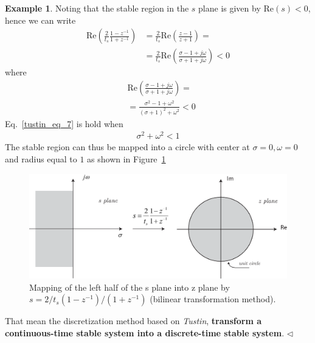\documentclass[11pt,a4paper,oneside]{book}
\numberwithin{equation}{section}
\theoremstyle{it}
\theoremstyle{definition}
\newtheorem{example}{Example}[chapter]
\begin{document}
\begin{example}
Noting that the stable region in the $s$ plane is given by $\text{Re}(s)<0$, hence we can write
\begin{equation}\label{tustin_eq_6}
	\begin{split}
		\text{Re}\left(\frac{2}{t_s}\frac{1-z^{-1}}{1+z^{-1}} \right) &= \frac{2}{t_s}\text{Re}\left(\frac{z-1}{z+1} \right) = \\[6pt]
		&= \frac{2}{t_s}\text{Re}\left(\frac{\sigma -1 +j\omega}{\sigma+1+j\omega} \right)<0
	\end{split}
\end{equation}
where
\begin{equation}\label{tustin_eq_7}
	\begin{split}
		& \text{Re}\left(\frac{\sigma -1 +j\omega}{\sigma+1+j\omega} \right) = \\[6pt]
		& = \frac{\sigma^2-1+\omega^2}{(\sigma+1)^2+\omega^2} <0
	\end{split}
\end{equation}
Eq.~\eqref{tustin_eq_7} is hold when
\begin{equation}\label{tustin_eq_8}
	\begin{split}
		\sigma^2+\omega^2 < 1
	\end{split}
\end{equation}
The stable region can thus be mapped into a circle with center at $\sigma = 0, \omega=0$ and radius equal to $1$ as shown in Figure~\ref{figure_discretization_5}
\begin{figure}[H]
	\centering
	\includegraphics[width = 380pt, 
	keepaspectratio]{figures/discretization/bilinear_mapping.eps}
	\captionsetup{width=0.5\textwidth, font=small}		
	\caption{Mapping of the left half of the s plane into z plane by $s = 
	2/t_s(1-z^{-1})/(1+z^{-1})$ (bilinear transformation method).}
	\label{figure_discretization_5}
\end{figure}
That mean the discretization method based on \textit{Tustin}, \textbf{transform 
a continuous-time stable system into a discrete-time stable system}.
$\triangleleft$ 
\end{example}
\end{document}
